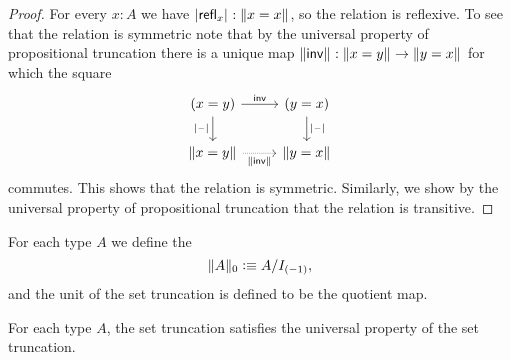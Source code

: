 \begin{proof}
For every $x:A$ we have $\bproj{\refl{x}}:\brck{x=x}$, so the relation is reflexive. To see that the relation is symmetric note that by the universal property of propositional truncation there is a unique map $\brck{\invfunc}:\brck{x=y}\to\brck{y=x}$ for which the square
\begin{equation*}
\begin{tikzcd}
(x=y) \arrow[r,"\invfunc"] \arrow[d,swap,"\bproj{\blank}"] & (y=x) \arrow[d,"\bproj{\blank}"] \\
\brck{x=y} \arrow[r,densely dotted,swap,"\brck{\invfunc}"] & \brck{y=x}
\end{tikzcd}
\end{equation*}
commutes. This shows that the relation is symmetric. Similarly, we show by the universal property of propositional truncation that the relation is transitive.
\end{proof}

\begin{defn}
For each type $A$ we define the 
\begin{equation*}
\trunc{0}{A}\defeq A/I_{(-1)},
\end{equation*}
and the unit of the set truncation is defined to be the quotient map.
\end{defn}

\begin{thm}
For each type $A$, the set truncation satisfies the universal property of the set truncation.
\end{thm}

